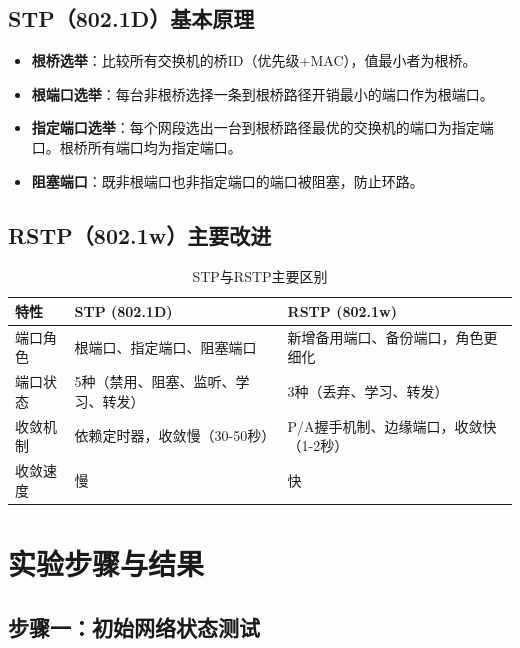 \documentclass[a4paper]{article}
\begin{document}
\subsection{STP（802.1D）基本原理}

\begin{itemize}
    \item \textbf{根桥选举}：比较所有交换机的桥ID（优先级+MAC），值最小者为根桥。
    \item \textbf{根端口选举}：每台非根桥选择一条到根桥路径开销最小的端口作为根端口。
    \item \textbf{指定端口选举}：每个网段选出一台到根桥路径最优的交换机的端口为指定端口。根桥所有端口均为指定端口。
    \item \textbf{阻塞端口}：既非根端口也非指定端口的端口被阻塞，防止环路。
\end{itemize}

\subsection{RSTP（802.1w）主要改进}

\begin{table}[H]
    \centering
    \begin{tabular}{|p{3cm}|p{4cm}|p{4cm}|}
        \hline
        \textbf{特性} & \textbf{STP (802.1D)} & \textbf{RSTP (802.1w)} \\
        \hline
        端口角色 & 根端口、指定端口、阻塞端口 & 新增备用端口、备份端口，角色更细化 \\
        \hline
        端口状态 & 5种（禁用、阻塞、监听、学习、转发） & 3种（丢弃、学习、转发） \\
        \hline
        收敛机制 & 依赖定时器，收敛慢（30-50秒） & P/A握手机制、边缘端口，收敛快（1-2秒） \\
        \hline
        收敛速度 & 慢 & 快 \\
        \hline
    \end{tabular}
    \caption{STP与RSTP主要区别}
\end{table}

\section{实验步骤与结果}

\subsection{步骤一：初始网络状态测试}
\end{document}
